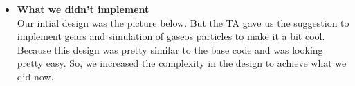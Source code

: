 \documentclass{article}
\begin{document}
\begin{itemize}
    \item[] \textbf{\Large What we didn't implement} \\ 
Our intial design was the picture below.
But the TA gave us the suggestion to implement gears and simulation of gaseos particles to make it a bit cool. Because this design was pretty similar to the base code and was looking pretty easy. So, we increased the complexity in the design to achieve what we did now.
\\ \vspace{0.2 cm}

\end{itemize}
\end{document}
